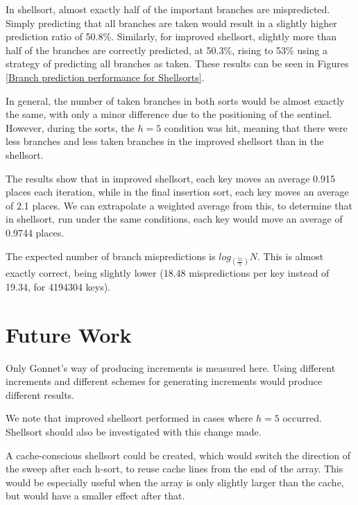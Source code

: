 
In shellsort, almost exactly half of the important branches are mispredicted.
Simply predicting that all branches are taken would result in a slightly higher
prediction ratio of 50.8\%. Similarly, for improved shellsort, slightly more
than half of the branches are correctly predicted, at 50.3\%, rising to 53\%
using a strategy of predicting all branches as taken. These results can be seen
in Figures \ref{Branch prediction performance for Shellsorts}.

In general, the number of taken branches in both sorts would be almost exactly
the same, with only a minor difference due to the positioning of the sentinel.
However, during the sorts, the $h = 5$ condition was hit, meaning that there
were less branches and less taken branches in the improved shellsort than in the
shellsort.

The results show that in improved shellsort, each key moves an average 0.915
places each iteration, while in the final insertion sort, each key moves an
average of 2.1 places. We can extrapolate a weighted average from this, to
determine that in shellsort, run under the same conditions, each key would move
an average of 0.9744 places.

The expected number of branch mispredictions is $log_{(\frac{11}{5})}N$. This
is almost exactly correct, being slightly lower (18.48 mispredictions per key
instead of 19.34, for 4194304 keys).


\section{Future Work}

Only Gonnet's way of producing increments is measured here. Using different
increments and different schemes for generating increments would produce
different results.

We note that improved shellsort performed in cases where $h = 5$ occurred.
Shellsort should also be investigated with this change made.

A cache-conscious shellsort could be created, which would switch the direction
of the sweep after each h-sort, to reuse cache lines from the end of the array.
This would be especially useful when the array is only slightly larger than the
cache, but would have a smaller effect after that.
